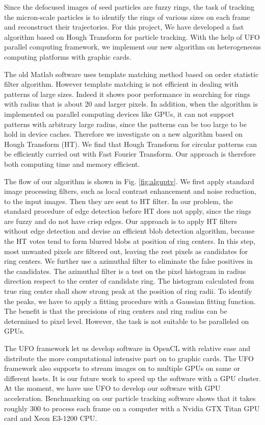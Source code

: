\documentclass{article}
\begin{document}
Since the defocused images of seed particles are fuzzy rings, the task of
tracking the micron-scale particles is to identify the rings of various sizes
on each frame and reconstruct their trajectories. For this project, We have
developed a fast algorithm based on Hough Transform for particle tracking.
With the help of UFO parallel computing framework, we implement our new algorithm on
heterogeneous computing platforms with graphic cards. 


The old Matlab software uses template matching method based on order statistic
filter algorithm. However template matching is not efficient in dealing with
patterns of large sizes. Indeed it shows poor performance in searching for
rings with radius that is about 20 and larger pixels. In addition, when the
algorithm is implemented on parallel computing devices like GPUs, it can not
support patterns with arbitrary large radius, since the patterns can be too
large to be hold in device caches. Therefore we investigate on a new algorithm
based on Hough Transform (HT). We find that Hough Transform for circular
patterns can be efficiently carried out with Fast Fourier Transform. Our
approach is therefore both computing time and memory efficient.

The flow of our algorithm is shown in Fig. \ref{fig:alguptv}.  We first apply
standard image processing filters, such as local contrast enhancement and noise
reduction, to the input images. Then they are sent to HT filter. In our
problem, the standard procedure of edge detection before HT does not apply,
since the rings are fuzzy and do not have crisp edges. Our approach is to apply
HT filters without edge detection and devise an efficient blob detection
algorithm, because the HT votes tend to form blurred blobs at position of ring
centers.  In this step, most unwanted pixels are filtered out, leaving the rest
pixels as candidates for ring centers.  We further use a azimuthal filter to
eliminate the false positives in the candidates. The azimuthal filter is a test
on the pixel histogram in radius direction respect to the center of candidate
ring. The histogram calculated from true ring center shall show strong peak at
the position of ring radii. To identify the peaks, we have to apply a fitting
procedure with a Gaussian fitting function. The benefit is that the precisions
of ring centers and ring radius can be determined to pixel level. However,
the task is not suitable to be paralleled on GPUs.

The UFO framework let us develop software in OpenCL with relative ease and
distribute the more computational intensive part on to graphic cards. The UFO
framework also supports to stream images on to multiple GPUs on same or
different hosts.  It is our future work to speed up the software with a GPU
cluster. At the moment, we have use UFO to develop our software with GPU
acceleration.  Benchmarking on our particle tracking software shows that it
takes roughly 300 to process each frame on a computer with a Nvidia GTX Titan
GPU card and Xeon E3-1200 CPU.  
\end{document}
